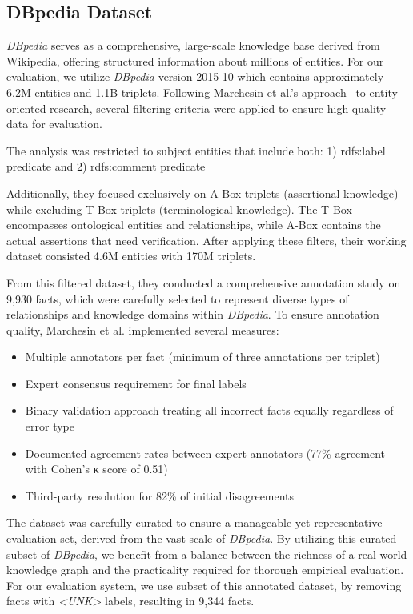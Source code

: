 \subsection{DBpedia Dataset}\label{subsec:empirical-evaluation:dataset-analysis:dbpedia}
\textit{DBpedia} serves as a comprehensive, large-scale knowledge base derived from Wikipedia, offering structured information about millions of entities.
For our evaluation, we utilize \textit{DBpedia} version 2015-10 which contains approximately 6.2M entities and 1.1B triplets.
Following Marchesin et al.'s approach~\cite{Marchesin_Silvello_Alonso_2024} to entity-oriented research, several filtering criteria were applied to ensure high-quality data for evaluation.

The analysis was restricted to subject entities that include both: 1) rdfs:label predicate and 2) rdfs:comment predicate

Additionally, they focused exclusively on A-Box triplets (assertional knowledge) while excluding T-Box triplets (terminological knowledge).
The T-Box encompasses ontological entities and relationships, while A-Box contains the actual assertions that need verification.
After applying these filters, their working dataset consisted 4.6M entities with 170M triplets.

From this filtered dataset, they conducted a comprehensive annotation study on 9,930 facts, which were carefully selected to represent diverse types of relationships and knowledge domains within \textit{DBpedia}.
To ensure annotation quality, Marchesin et al. implemented several measures:
\begin{itemize}
    \item Multiple annotators per fact (minimum of three annotations per triplet)
    \item Expert consensus requirement for final labels
    \item Binary validation approach treating all incorrect facts equally regardless of error type
    \item Documented agreement rates between expert annotators (77\% agreement with Cohen's κ score of 0.51)
    \item Third-party resolution for 82\% of initial disagreements
\end{itemize}

The dataset was carefully curated to ensure a manageable yet representative evaluation set, derived from the vast scale of \textit{DBpedia}.
By utilizing this curated subset of \textit{DBpedia}, we benefit from a balance between the richness of a real-world knowledge graph and the practicality required for thorough empirical evaluation.
For our evaluation system, we use subset of this annotated dataset, by removing facts with \textit{<UNK>} labels, resulting in 9,344 facts.

